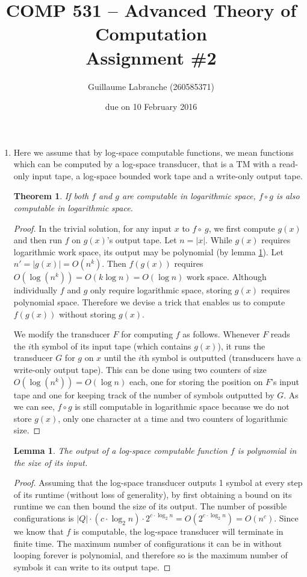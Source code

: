 \documentclass{article}
\author{Guillaume Labranche (260585371)}
\title{COMP 531 -- Advanced Theory of Computation\\Assignment \#2}
\date{due on 10 February 2016}
\newtheorem{theorem}{Theorem}
\newtheorem{lemma}{Lemma}
\begin{document}
\maketitle

\begin{enumerate}

\item Here we assume that by log-space computable functions, we mean functions which can be computed by a log-space transducer, that is a TM with a read-only input tape, a log-space bounded work tape and a write-only output tape.

\begin{theorem}If both $f$ and $g$ are computable in logarithmic space, $f \circ g$ is also computable in logarithmic space.
\end{theorem}
\begin{proof} In the trivial solution, for any input $x$ to $f \circ\ g$, we first compute $g(x)$ and then run $f$ on $g(x)$'s output tape. Let $n=|x|$. While $g(x)$ requires logarithmic work space, its output may be polynomial (by lemma \ref{lemma_logspace_polynomial}). Let $n' = |g(x)| = O(n^k)$. Then $f(g(x))$ requires $O(\log(n^k)) = O(k \log n) = O(\log n)$ work space. Although individually $f$ and $g$ only require logarithmic space, storing $g(x)$ requires polynomial space. Therefore we devise a trick that enables us to compute $f(g(x))$ without storing $g(x)$.

We modify the transducer $F$ for computing $f$ as follows. Whenever $F$ reads the $i$th symbol of its input tape (which contains $g(x)$), it runs the transducer $G$ for $g$ on $x$ until the $i$th symbol is outputted (transducers have a write-only output tape). This can be done using two counters of size $O(\log(n^k))=O(\log n)$ each, one for storing the position on $F$'s input tape and one for keeping track of the number of symbols outputted by $G$. As we can see, $f \circ g$ is still computable in logarithmic space because we do not store $g(x)$, only one character at a time and two counters of logarithmic size.
\end{proof}

\begin{lemma}\label{lemma_logspace_polynomial}
The output of a log-space computable function $f$ is polynomial in the size of its input.
\end{lemma}
\begin{proof}
Assuming that the log-space transducer outputs 1 symbol at every step of its runtime (without loss of generality), by first obtaining a bound on its runtime we can then bound the size of its output. The number of possible configurations is $|Q| \cdot (c \cdot \log_2 n) \cdot 2^{c \cdot \log_2 n} = O(2^{c \cdot \log_2 n}) = O(n^c)$. Since we know that $f$ is computable, the log-space transducer will terminate in finite time. The maximum number of configurations it can be in without looping forever is polynomial, and therefore so is the maximum number of symbols it can write to its output tape.
\end{proof}


\end{enumerate}
\end{document}
